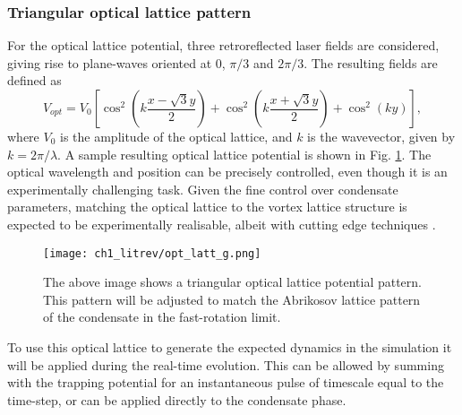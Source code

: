 \subsubsection{Triangular optical lattice pattern}
For the optical lattice potential, three retroreflected laser fields are considered, giving rise to plane-waves oriented at 0, $\pi/3$ and $2\pi/3$. The resulting fields are defined as 
\begin{equation}\label{eqn:lattice_potential_tri}
V_{opt} = V_0\left[\cos^2\left(k\frac{x-\sqrt{3}y}{2} \right) + \cos^2\left(k\frac{x+\sqrt{3}y}{2} \right) +\cos^2\left(ky\right)\right],
\end{equation}
where $V_0$ is the amplitude of the optical lattice, and $k$ is the wavevector, given by $k=2\pi/\lambda$. A sample resulting optical lattice potential is shown in Fig. \ref{fig:optical_lattice}. The optical wavelength and position can be precisely controlled, even though it is an experimentally challenging task. Given the fine control over condensate parameters, matching the optical lattice to the vortex lattice structure is expected to be experimentally realisable, albeit with cutting edge techniques \cite{Vtx:Tung_prl_2006}.
\begin{figure}
\centering
	\texttt{[image: ch1\_litrev/opt\_latt\_g.png]}
	\caption{The above image shows a triangular optical lattice potential pattern. This pattern will be adjusted to match the Abrikosov lattice pattern of the condensate in the fast-rotation limit.}\label{fig:optical_lattice}
\end{figure}
To use this optical lattice to generate the expected dynamics in the simulation it will be applied during the real-time evolution. This can be allowed by summing with the trapping potential for an instantaneous pulse of timescale equal to the time-step, or can be applied directly to the condensate phase.

